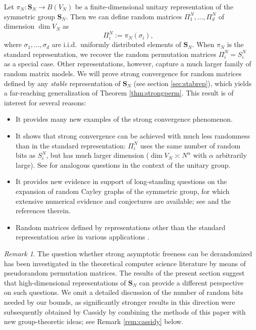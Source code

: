 \documentclass[10pt,reqno]{amsart}
\theoremstyle{definition}
\theoremstyle{remark}
\newtheorem{rem}[thm]{Remark}
\numberwithin{equation}{section}
\numberwithin{figure}{section}
\numberwithin{table}{section}
\begin{document}
Let $\pi_N:\mathbf{S}_N\to B(V_N)$ be a finite-dimensional unitary 
representation of the symmetric group $\mathbf{S}_N$. Then we can define 
random matrices $\Pi^N_1,\ldots,\Pi^N_d$ of dimension $\dim V_N$ as
\begin{equation}
\label{eq:stablermtx}
	\Pi_i^N := \pi_N(\sigma_i),
\end{equation}
where $\sigma_1,\ldots,\sigma_d$ are i.i.d.\ uniformly distributed 
elements of $\mathbf{S}_N$. When $\pi_N$ is the standard representation,
we recover the random permutation matrices $\Pi_i^N=S_i^N$ as a special 
case. Other representations, however, capture a much 
larger family of random matrix models. We will prove strong 
convergence for random matrices defined by any 
\emph{stable} representation of $\mathbf{S}_N$ (see section 
\ref{sec:stabrep}), which yields a far-reaching generalization of Theorem 
\ref{thm:strongperm}. This result is of interest for several 
reasons:\vspace*{.5mm}
\begin{itemize}[leftmargin=*]
\addtolength{\itemsep}{.2cm}
\item It provides many new examples of the strong convergence
phenomenon.
\item It shows that strong convergence can be achieved with much less 
randomness than in the standard representation: $\Pi^N_i$ uses the 
same number of random bits as $S_i^N$, but has much larger dimension 
($\dim V_N \asymp N^\alpha$ with $\alpha$ arbitrarily large). 
See \cite{BC20} for analogous questions in the context of the unitary 
group.
\item 
It provides new evidence in support of
long-standing questions on the expansion of random Cayley
graphs of the symmetric group, for which extensive numerical evidence
and conjectures are available; see \cite{RS19} and the references therein.
\item Random matrices defined by representations other than the standard
representation arise in various applications \cite{FJRST96,HH09}.
\end{itemize}

\begin{rem}
The question whether strong asymptotic freeness can be 
derandomized has been investigated in the theoretical computer science 
literature \cite{MOP19,OW20} by means of pseudorandom permutation 
matrices. The results of the present section suggest that high-dimensional 
representations of $\mathbf{S}_N$ can provide a different perspective 
on such questions. We omit a detailed discussion of the number of random 
bits needed by our bounds, as significantly stronger results in this 
direction were subsequently obtained by Cassidy \cite{Cas24} by combining 
the methods of this paper with new group-theoretic ideas; see Remark
\ref{rem:cassidy} below.
\end{rem}
\end{document}
